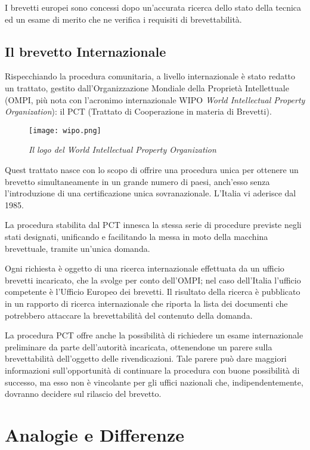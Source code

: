I brevetti europei sono concessi dopo un'accurata ricerca dello stato della tecnica ed un esame di merito che ne verifica i requisiti di brevettabilità.
\subsection{Il brevetto Internazionale}
Rispecchiando la procedura comunitaria, a livello internazionale è stato redatto un trattato, gestito dall'Organizzazione Mondiale della Proprietà Intellettuale (OMPI, più nota con l'acronimo internazionale WIPO \textit{World Intellectual Property Organization}): il PCT (Trattato di Cooperazione in materia di Brevetti).

\begin{figure}[hb]
\centering
	\texttt{[image: wipo.png]}
\caption{\textit{Il logo del World Intellectual Property Organization}}
\end{figure}
Quest trattato nasce con lo scopo di offrire una procedura unica per ottenere un brevetto simultaneamente in un grande numero di paesi, anch'esso senza l'introduzione di una certificazione unica sovranazionale. L'Italia vi aderisce dal 1985.

La procedura stabilita dal PCT innesca la stessa serie di procedure previste negli stati designati, unificando e facilitando la messa in moto della macchina brevettuale, tramite un'unica domanda.

Ogni richiesta è oggetto di una ricerca internazionale effettuata da un ufficio brevetti incaricato, che la svolge per conto dell'OMPI; nel caso dell'Italia l'ufficio competente è l'Ufficio Europeo dei brevetti. Il risultato della ricerca è pubblicato in un rapporto di ricerca internazionale che riporta la lista dei documenti che potrebbero attaccare la brevettabilità del contenuto della domanda.

La procedura PCT offre anche la possibilità di richiedere un esame internazionale preliminare da parte dell'autorità incaricata, ottenendone un parere sulla brevettabilità dell'oggetto delle rivendicazioni. Tale parere può dare maggiori informazioni sull'opportunità di continuare la procedura con buone possibilità di successo, ma esso non è vincolante per gli uffici nazionali che, indipendentemente, dovranno decidere sul rilascio del brevetto.

\section{Analogie e Differenze}\label{sec:analogDiffBrevetti}

